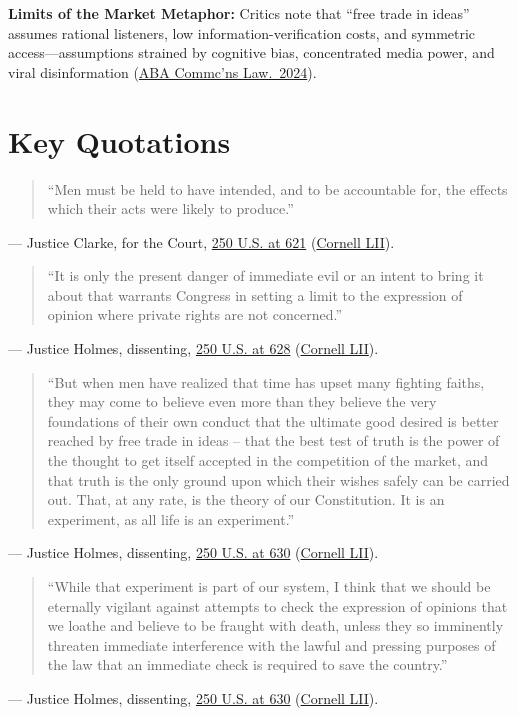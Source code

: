 \documentclass[12pt]{article}
\begin{document}
\textbf{Limits of the Market Metaphor:} Critics note that ``free trade in ideas'' assumes rational listeners, low information-verification costs, and symmetric access---assumptions strained by cognitive bias, concentrated media power, and viral disinformation (\href{https://www.americanbar.org/groups/communications_law/resources/magazine/2024-summer/listener-based-individual-autonomy-theory-freedom-speech/}{ABA Commc'ns Law.\ 2024}).

\section{Key Quotations}
\begin{quote}
``Men must be held to have intended, and to be accountable for, the effects which their acts were likely to produce.''
\end{quote}
\noindent --- Justice Clarke, for the Court, \href{https://supreme.justia.com/cases/federal/us/250/616/}{250 U.S. at 621} (\href{https://www.law.cornell.edu/supremecourt/text/250/616}{Cornell LII}).

\begin{quote}
``It is only the present danger of immediate evil or an intent to bring it about that warrants Congress in setting a limit to the expression of opinion where private rights are not concerned.''
\end{quote}
\noindent --- Justice Holmes, dissenting, \href{https://supreme.justia.com/cases/federal/us/250/616/}{250 U.S. at 628} (\href{https://www.law.cornell.edu/supremecourt/text/250/616}{Cornell LII}).

\begin{quote}
``But when men have realized that time has upset many fighting faiths, they may come to believe even more than they believe the very foundations of their own conduct that the ultimate good desired is better reached by free trade in ideas -- that the best test of truth is the power of the thought to get itself accepted in the competition of the market, and that truth is the only ground upon which their wishes safely can be carried out. That, at any rate, is the theory of our Constitution. It is an experiment, as all life is an experiment.''
\end{quote}
\noindent --- Justice Holmes, dissenting, \href{https://supreme.justia.com/cases/federal/us/250/616/}{250 U.S. at 630} (\href{https://www.law.cornell.edu/supremecourt/text/250/616}{Cornell LII}).

\begin{quote}
``While that experiment is part of our system, I think that we should be eternally vigilant against attempts to check the expression of opinions that we loathe and believe to be fraught with death, unless they so imminently threaten immediate interference with the lawful and pressing purposes of the law that an immediate check is required to save the country.''
\end{quote}
\noindent --- Justice Holmes, dissenting, \href{https://supreme.justia.com/cases/federal/us/250/616/}{250 U.S. at 630} (\href{https://www.law.cornell.edu/supremecourt/text/250/616}{Cornell LII}).
\end{document}

